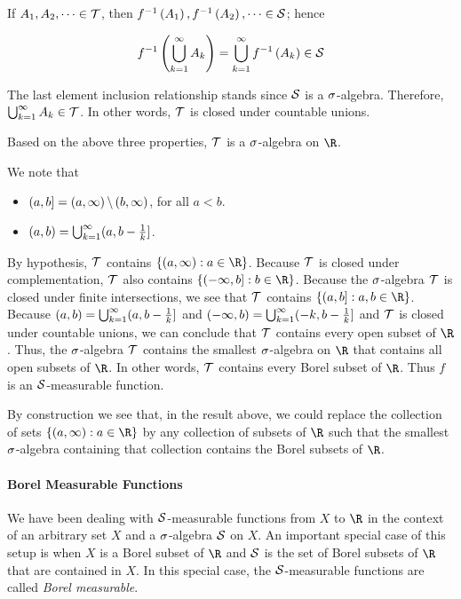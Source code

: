 \documentclass[
]{article}
\begin{document}
If \(A_1,A_2,\cdots \in \T\), then
\(\inv f\pr{A_1},\inv f\pr{A_2},\cdots \in \S\); hence

\[\inv f\pr{\uinf A_k} = \uinf \inv f\pr{A_k}\in \S\]

The last element inclusion relationship stands since \(\S\) is a
\(\s\)-algebra. Therefore, \(\uinf A_k\in \T\). In other words, \(\T\)
is closed under countable unions.

Based on the above three properties, \(\T\) is a \(\s\)-algebra on
\(\R\).

We note that

\begin{itemize}
\item
  \((a,b] = \pr{a,\infty}\backslash \pr{b,\infty}\), for all \(a<b\).
\item
  \(\pr{a,b} = \uinf (a,b-\frac1k]\).
\end{itemize}

By hypothesis, \(\T\) contains \(\brace{\pr{a,\infty}:a\in \R}\).
Because \(\T\) is closed under complementation, \(\T\) also contains
\(\brace{(-\infty,b]:b\in \R}\). Because the \(\s\)-algebra \(\T\) is
closed under finite intersections, we see that \(\T\) contains
\(\brace{(a,b]:a,b\in \R}\). Because \(\pr{a,b} = \uinf (a,b-\frac1k]\)
and \(\pr{-\infty,b} = \uinf(-k,b-\frac1k]\) and \(\T\) is closed under
countable unions, we can conclude that \(\T\) contains every open subset
of \(\R\). Thus, the \(\s\)-algebra \(\T\) contains the smallest
\(\s\)-algebra on \(\R\) that contains all open subsets of \(\R\). In
other words, \(\T\) contains every Borel subset of \(\R\). Thus \(f\) is
an \(\S\)-measurable function.

By construction we see that, in the result above, we could replace the
collection of sets \(\brace{\pr{a,\infty}:a\in \R}\) by any collection
of subsets of \(\R\) such that the smallest \(\s\)-algebra containing
that collection contains the Borel subsets of \(\R\).

\hypertarget{borel-measurable-functions}{%
\paragraph{Borel Measurable
Functions}\label{borel-measurable-functions}}

We have been dealing with \(\S\)-measurable functions from \(X\) to
\(\R\) in the context of an arbitrary set \(X\) and a \(\s\)-algebra
\(\S\) on \(X\). An important special case of this setup is when \(X\)
is a Borel subset of \(\R\) and \(\S\) is the set of Borel subsets of
\(\R\) that are contained in \(X\). In this special case, the
\(\S\)-measurable functions are called \emph{Borel measurable}.
\end{document}
